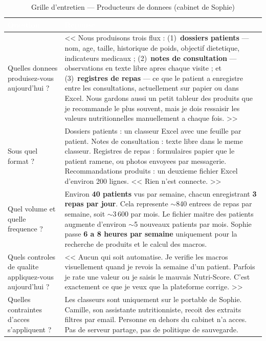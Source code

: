 \documentclass[a4paper,11pt,oneside,openany]{report}
\begin{document}
\begin{table}[H]
\centering
\caption{Grille d'entretien --- Producteurs de donnees (cabinet de Sophie)}
\label{tab:grid-prod}
\begin{tabularx}{\textwidth}{L{4cm} X}
\toprule
{}
\textcolor{white}{\textbf{Question}} & \textcolor{white}{\textbf{Reponse}} \\
\midrule
Quelles donnees produisez-vous aujourd'hui ? &
<< Nous produisons trois flux : (1)~\textbf{dossiers patients} --- nom,
age, taille, historique de poids, objectif dietetique, indicateurs
medicaux ; (2)~\textbf{notes de consultation} --- observations en texte
libre apres chaque visite ; et (3)~\textbf{registres de repas} --- ce
que le patient a enregistre entre les consultations, actuellement sur
papier ou dans Excel. Nous gardons aussi un petit tableur des produits
que je recommande le plus souvent, mais je dois ressaisir les valeurs
nutritionnelles manuellement a chaque fois. >>
\\
\addlinespace
Sous quel format ? &
Dossiers patients : un classeur Excel avec une feuille par patient.
Notes de consultation : texte libre dans le meme classeur. Registres
de repas : formulaires papier que le patient ramene, ou photos envoyees
par messagerie. Recommandations produits : un deuxieme fichier Excel
d'environ 200 lignes. << Rien n'est connecte. >>
\\
\addlinespace
Quel volume et quelle frequence ? &
Environ \textbf{40 patients} vus par semaine, chacun enregistrant
\textbf{3 repas par jour}. Cela represente $\sim$840 entrees de repas
par semaine, soit $\sim$3\,600 par mois. Le fichier maitre des patients
augmente d'environ $\sim$5 nouveaux patients par mois. Sophie passe
\textbf{6 a 8 heures par semaine} uniquement pour la recherche de
produits et le calcul des macros.
\\
\addlinespace
Quels controles de qualite appliquez-vous aujourd'hui ? &
<< Aucun qui soit automatise. Je verifie les macros visuellement
quand je revois la semaine d'un patient. Parfois je rate une valeur
ou je saisis le mauvais Nutri-Score. C'est exactement ce que je
veux que la plateforme corrige. >>
\\
\addlinespace
Quelles contraintes d'acces s'appliquent ? &
Les classeurs sont uniquement sur le portable de Sophie. Camille, son
assistante nutritionniste, recoit des extraits filtres par email.
Personne en dehors du cabinet n'a acces. Pas de serveur partage,
pas de politique de sauvegarde.

\end{tabularx}
\end{table}
\end{document}
